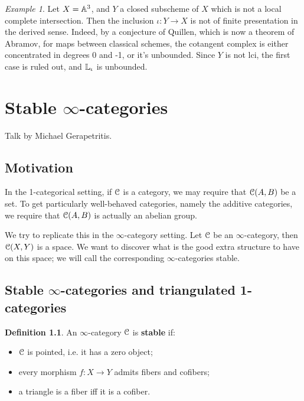 \documentclass[10pt,a4paper,reqno,oneside]{book} %
\theoremstyle{plain}
\theoremstyle{definition}
\newtheorem{defin}[thm]{Definition}
\theoremstyle{remark}
\newtheorem{eg}[thm]{Example}
\numberwithin{equation}{section}
\begin{document}
\begin{eg}
Let $X = \mathbb A^3$, and $Y$ a closed subscheme of $X$ which is not a local complete intersection. 
Then the inclusion $\iota :Y \to X$ is not of finite presentation in the derived sense.
Indeed, by a conjecture of Quillen, which is now a theorem of Abramov, for maps between classical schemes, the cotangent 
complex is either concentrated in degrees 0 and -1, or it's unbounded. Since $Y$ is not lci, the first case is ruled out,
and $\mathbb L_{\iota}$ is unbounded.
\end{eg}





\chapter{Stable $\infty$-categories}
Talk by Michael Gerapetritis.

\section{Motivation}
\label{sect:motivation}

In the 1-categorical setting, if $\mathcal C$ is a category, we may require that $\mathcal C(A,B)$ be a set. 
To get particularly well-behaved categories, namely the additive categories, we require that $\mathcal C(A,B)$ is actually
an abelian group. 

We try to replicate this in the $\infty$-category setting.
Let $\mathcal C$ be an $\infty$-category, then $\mathcal C(X,Y)$ is a space. We want to discover what is the good extra structure to have on 
this space; we will call the corresponding $\infty$-categories stable.


\section{Stable $\infty$-categories and triangulated 1-categories}

\begin{defin}
An $\infty$-category $\mathcal C$ is \textbf{stable} if:
\begin{itemize}
\item $\mathcal C$ is pointed, i.e. it has a zero object;
\item every morphism $f : X \to Y$ admits fibers and cofibers;
\item a triangle is a fiber iff it is a cofiber.
\end{itemize}
\end{defin}
\end{document}

